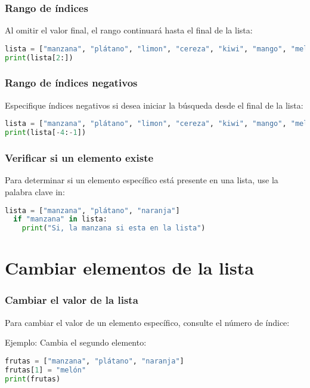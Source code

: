 \begin{frame}[fragile]
  \frametitle{Rango de índices}

  Al omitir el valor final, el rango continuará hasta el final de la lista: 
  \vspace{\baselineskip}
  \begin{lstlisting}[language=Python]
lista = ["manzana", "plátano", "limon", "cereza", "kiwi", "mango", "melon"]
print(lista[2:]) 
  \end{lstlisting}
\end{frame}

\begin{frame}[fragile]
  \frametitle{Rango de índices negativos}

  Especifique índices negativos si desea iniciar la búsqueda
  desde el final de la lista:

  \vspace{\baselineskip}
  \begin{lstlisting}[language=Python]
lista = ["manzana", "plátano", "limon", "cereza", "kiwi", "mango", "melon"]
print(lista[-4:-1]) 
  \end{lstlisting}
\end{frame}

\begin{frame}[fragile]
  \frametitle{Verificar si un elemento existe}

  Para determinar si un elemento específico está presente en una lista,
  use la palabra clave
  \textcolor{codeKeyword}{in}:

  \vspace{\baselineskip}
  \begin{lstlisting}[language=Python]
  lista = ["manzana", "plátano", "naranja"]
  if "manzana" in lista:
    print("Si, la manzana si esta en la lista")
  \end{lstlisting}
\end{frame}

\section{Cambiar elementos de la lista}

\begin{frame}[fragile]
  \frametitle{Cambiar el valor de la lista}

  Para cambiar el valor de un elemento específico,
  consulte el número de índice:

  \vspace{\baselineskip}
  Ejemplo: Cambia el segundo elemento:
  \begin{lstlisting}[language=Python]
frutas = ["manzana", "plátano", "naranja"]
frutas[1] = "melón"
print(frutas)
  \end{lstlisting}
\end{frame}

